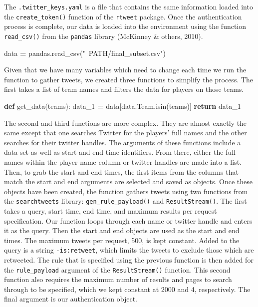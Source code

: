 \documentclass[12pt,twoside]{reedthesis}
\newenvironment{Shaded}{\begin{snugshade}}{\end{snugshade}}
\newcommand{\KeywordTok}[1]{\textcolor[rgb]{0.13,0.29,0.53}{\textbf{#1}}}
\newcommand{\StringTok}[1]{\textcolor[rgb]{0.31,0.60,0.02}{#1}}
\newcommand{\ControlFlowTok}[1]{\textcolor[rgb]{0.13,0.29,0.53}{\textbf{#1}}}
\newcommand{\OperatorTok}[1]{\textcolor[rgb]{0.81,0.36,0.00}{\textbf{#1}}}
\newcommand{\NormalTok}[1]{#1}
\begin{document}
The \texttt{.twitter\_keys.yaml} is a file that contains the same
information loaded into the \texttt{create\_token()} function of the
\texttt{rtweet} package. Once the authentication process is complete,
our data is loaded into the environment using the function
\texttt{read\_csv()} from the \texttt{pandas} library (McKinney \&
others, 2010).

\small
\begin{Shaded}
\begin{Highlighting}[]
\NormalTok{data }\OperatorTok{=}\NormalTok{ pandas.read_csv(}\StringTok{"~PATH/final_subset.csv"}\NormalTok{)}
\end{Highlighting}
\end{Shaded}
\normalsize

Given that we have many variables which need to change each time we run
the function to gather tweets, we created three functions to simplify
the process. The first takes a list of team names and filters the data
for players on those teams.

\small
\begin{Shaded}
\begin{Highlighting}[]
\KeywordTok{def}\NormalTok{ get_data(teams):}
\NormalTok{    data_1 }\OperatorTok{=}\NormalTok{ data[data.Team.isin(teams)]}
    \ControlFlowTok{return}\NormalTok{ data_1}
\end{Highlighting}
\end{Shaded}
\normalsize

The second and third functions are more complex. They are almost exactly
the same except that one searches Twitter for the players' full names
and the other searches for their twitter handles. The arguments of these
functions include a data set as well as start and end time identifiers.
From there, either the full names within the player name column or
twitter handles are made into a list. Then, to grab the start and end
times, the first items from the columns that match the start and end
arguments are selected and saved as objects. Once these objects have
been created, the function gathers tweets using two functions from the
\texttt{searchtweets} library: \texttt{gen\_rule\_payload()} and
\texttt{ResultStream()}. The first takes a query, start time, end time,
and maximum results per request specification. Our function loops
through each name or twitter handle and enters it as the query. Then the
start and end objects are used as the start and end times. The maximum
tweets per request, 500, is kept constant. Added to the query is a
string \texttt{-is:retweet}, which limits the tweets to exclude those
which are retweeted. The rule that is specified using the previous
function is then added for the \texttt{rule\_payload} argument of the
\texttt{ResultStream()} function. This second function also requires the
maximum number of results and pages to search through to be specified,
which we kept constant at 2000 and 4, respectively. The final argument
is our authentication object.
\end{document}
